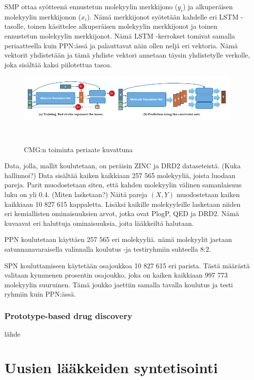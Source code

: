 \documentclass[finnish,twoside,censored,tkt,sw-line]{HYthesisML}
\begin{document}
SMP ottaa syötteenä ennustetun molekyylin merkkijono ($y_i$) ja alkuperäisen molekyylin merkkijonon ($x_i$).
Nämä merkkijonot syötetään kahdelle eri LSTM -tasolle, toinen käsittelee alkuperäisen molekyylin merkkijonot ja toinen ennustetun molekyylin merkkijonot.
Nämä LSTM -kerrokset tomivat samalla periaatteella kuin PPN:ässä ja palauttavat näin ollen neljä eri vektoria.
Nämä vektorit yhdistetään ja tämä yhdiste vektori annetaan täysin yhdistetylle verkolle, joka sisältää kaksi piilotettua tasoa.

\begin{figure}
    \centering
    \includegraphics[width=\textwidth]{CMG-fig.png}
    \caption{CMG:n toiminta periaate kuvattuna}
    ~\cite{ShinBonggun}
\end{figure}

Data, jolla, mallit koulutetaan, on peräisin ZINC ja DRD2 dataseteistä. (Kuka hallinnoi?)
Data sisältää kaiken kaikkiaan 257 565 molekyyliä, joista luodaan pareja.
Parit muodostetaan siten, että kahden molekyylin välinen samanlaisuus luku on yli 0.4. (Miten lasketaan?)
Näitä pareja $(X,Y)$ muodostetaan kaiken kaikkiaan 10 827 615 kappaletta.
Lisäksi kaikille molekyyleille lasketaan niiden eri kemiallisten ominaisuuksien arvot, jotka ovat PlogP, QED ja DRD2.
Nämä kuvaavat eri haluttuja ominaisuuksia, joita lääkkeiltä halutaan.

PPN koulutetaan käyttäen 257 565 eri molekyyliä.
nämä molekyylit jaetaan satunnanavaraisella valinnalla koulutus -ja testiryhmiin suhteella 8:2.

SPN kouluttamiseen käytetään osajoukkoa 10 827 615 eri parista.
Tästä määrästä valitaan kymmenen prosentin osajoukko, joka on kaiken kaikkiaan 997 773 molekyylin suuruinen.
Tämä joukko jaettiin samalla tavalla koulutus ja testi ryhmiin kuin PPN:ässä.

\subsection{Prototype-based drug discovery}

lähde~\cite{ShaharHarelAndKiraRadinsky}

\chapter{Uusien lääkkeiden syntetisointi}
\end{document}
